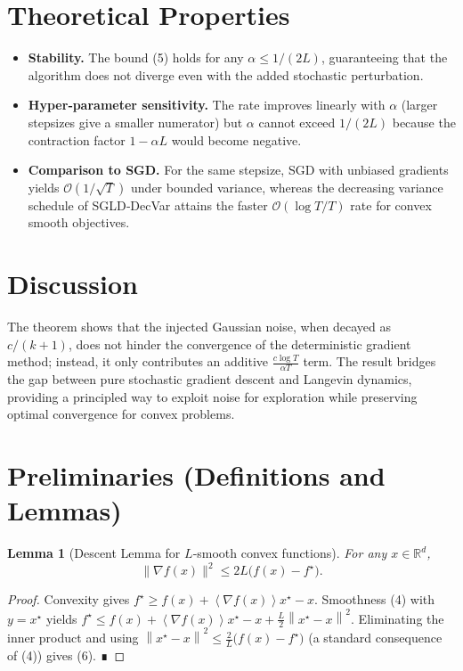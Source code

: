 \documentclass{article}
\newtheorem{lemma}{Lemma}
\newcommand{\R}{\mathbb{R}}
\newcommand{\norm}[1]{\left\|#1\right\|}
\newcommand{\inner}[1]{\left\langle#1\right\rangle}
\begin{document}
\section*{Theoretical Properties}
\begin{itemize}
\item \textbf{Stability.} The bound (5) holds for any $\alpha\le1/(2L)$,
      guaranteeing that the algorithm does not diverge even with the added
      stochastic perturbation.
\item \textbf{Hyper‑parameter sensitivity.}
      The rate improves linearly with $\alpha$ (larger stepsizes give a
      smaller numerator) but $\alpha$ cannot exceed $1/(2L)$ because the
      contraction factor $1-\alpha L$ would become negative.
\item \textbf{Comparison to SGD.}
      For the same stepsize, SGD with unbiased gradients yields
      $\mathcal O(1/\sqrt{T})$ under bounded variance, whereas the decreasing
      variance schedule of SGLD‑DecVar attains the faster
      $\mathcal O(\log T/T)$ rate for convex smooth objectives.
\end{itemize}

\section*{Discussion}
The theorem shows that the injected Gaussian noise, when decayed as
$c/(k+1)$, does not hinder the convergence of the deterministic gradient
method; instead, it only contributes an additive $\frac{c\log T}{\alpha T}$
term. The result bridges the gap between pure stochastic gradient descent
and Langevin dynamics, providing a principled way to exploit noise for
exploration while preserving optimal convergence for convex problems.

\section*{Preliminaries (Definitions and Lemmas)}
\begin{lemma}[Descent Lemma for $L$‑smooth convex functions]\label{lem:descent}
For any $x\in\R^{d}$,
\[
\|\nabla f(x)\|^{2}\le 2L\bigl(f(x)-f^{\star}\bigr).
\tag{6}
\]
\end{lemma}
\begin{proof}
Convexity gives $f^{\star}\ge f(x)+\inner{\nabla f(x)}{x^{\star}-x}$.  
Smoothness (4) with $y=x^{\star}$ yields
$f^{\star}\le f(x)+\inner{\nabla f(x)}{x^{\star}-x}
+\frac{L}{2}\norm{x^{\star}-x}^{2}$.  
Eliminating the inner product and using $\norm{x^{\star}-x}^{2}\le
\frac{2}{L}\bigl(f(x)-f^{\star}\bigr)$ (a standard consequence of (4))
gives (6). ∎
\end{proof}
\end{document}
